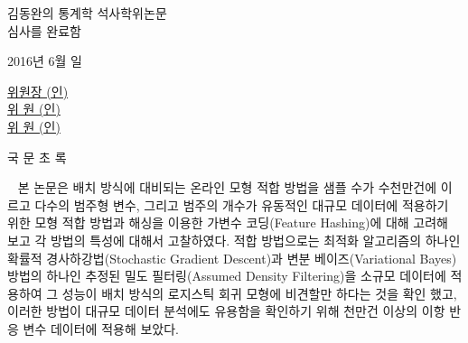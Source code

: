 \documentclass[oneside,b5paper,11pt]{book}
\theoremstyle{plain}
\theoremstyle{definition}
\theoremstyle{remark}
\theoremstyle{definition}
\numberwithin{equation}{chapter}
\begin{document}
\newpage{}		
 \linespread{1.0}
 \thispagestyle{empty}
 \vspace{20mm}
 \begin{center}
 {\LARGE 김동완의 통계학 석사학위논문 \\ 심사를 완료함}
 \end{center}
 \vspace{50mm}
 \begin{center}
{\Large 2016년 \quad 6월 \quad 일}
 \end{center}
 \vspace{85mm}
 \begin{center}
 {\Large  \underline{위원장 \hspace{60mm} (인)} \\ \vspace{7mm}
          \underline{위 \quad 원\hspace{60mm} (인)} \\ \vspace{7mm}
          \underline{위 \quad 원\hspace{60mm} (인)} \\ }
 \end{center}
 \linespread{1.6}





\newpage{}

\begin{center}
{\Large 국 문 초 록}
\end{center}
\vspace{1cm} {\small \ \indent
본 논문은 배치 방식에 대비되는 온라인 모형 적합 방법을 샘플 수가 수천만건에 이르고 다수의 범주형 변수, 그리고 범주의 개수가 유동적인 대규모 데이터에 적용하기 위한 모형 적합 방법과 해싱을 이용한 가변수 코딩(Feature Hashing)에 대해 고려해 보고 각 방법의 특성에 대해서 고찰하였다. 적합 방법으로는 최적화 알고리즘의 하나인 확률적 경사하강법(Stochastic Gradient Descent)과 변분 베이즈(Variational Bayes) 방법의 하나인 추정된 밀도 필터링(Assumed Density Filtering)을 소규모 데이터에 적용하여 그 성능이 배치 방식의 로지스틱 회귀 모형에 비견할만 하다는 것을 확인 했고, 이러한 방법이 대규모 데이터 분석에도 유용함을 확인하기 위해 천만건 이상의 이항 반응 변수 데이터에 적용해 보았다.
}

 \tableofcontents
 \newpage
 \listoftables
 \newpage
 \listoffigures

\newpage

 \setcounter{page}{1}
\end{document}
